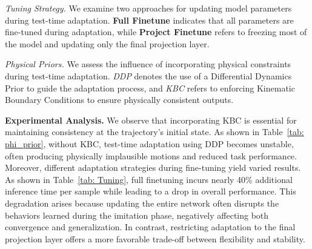 \documentclass{article}
\begin{document}
\textit{Tuning Strategy.} We examine two approaches for updating model parameters during test-time adaptation. \textbf{Full Finetune} indicates that all parameters are fine-tuned during adaptation, while \textbf{Project Finetune} refers to freezing most of the model and updating only the final projection layer.

\textit{Physical Priors.} We assess the influence of incorporating physical constraints during test-time adaptation. \textit{DDP} denotes the use of a Differential Dynamics Prior to guide the adaptation process, and \textit{KBC} refers to enforcing Kinematic Boundary Conditions to ensure physically consistent outputs.


\textbf{Experimental Analysis.}
We observe that incorporating KBC is essential for maintaining consistency at the trajectory's initial state. As shown in Table~\ref{tab: phi_prior}, without KBC, test-time adaptation using DDP becomes unstable, often producing physically implausible motions and reduced task performance.
Moreover, different adaptation strategies during fine-tuning yield varied results. As shown in Table~\ref{tab: Tuning}, full finetuning incurs nearly 40\% additional inference time per sample while leading to a drop in overall performance. This degradation arises because updating the entire network often disrupts the behaviors learned during the imitation phase, negatively affecting both convergence and generalization. In contrast, restricting adaptation to the final projection layer offers a more favorable trade-off between flexibility and stability.


 
\end{document}
